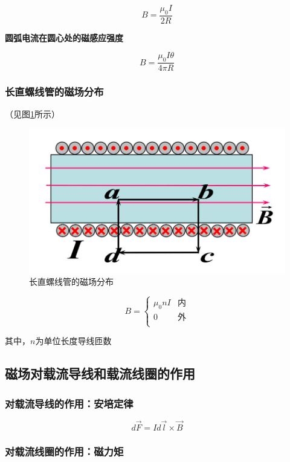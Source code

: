 \documentclass{ctexart}
\begin{document}
$$B=\frac{\mu_0I}{2R}$$

\textbf{圆弧电流在圆心处的磁感应强度}

$$B=\frac{\mu_0I\theta }{4\pi R}$$

\subsubsection{长直螺线管的磁场分布}

（见图\ref{figure12.4}所示）

\begin{figure}[h]
	\centering
	\includegraphics[scale=0.4]{images//chapter_12//figure_12.4.jpg} 
	\caption{长直螺线管的磁场分布}\label{figure12.4}
\end{figure}

\begin{equation*}
	B=\begin{cases}
		\mu_0nI&\text{内}\\
		0&\text{外}\\
	\end{cases}
\end{equation*}

其中，$n$为单位长度导线匝数

\subsection{磁场对载流导线和载流线圈的作用}

\subsubsection{对\textbf{载流导线}的作用：安培定律}

$$d\vec{F}=Id\vec{l}\times\vec{B}$$

\subsubsection{对\textbf{载流线圈}的作用：磁力矩}
\end{document}
